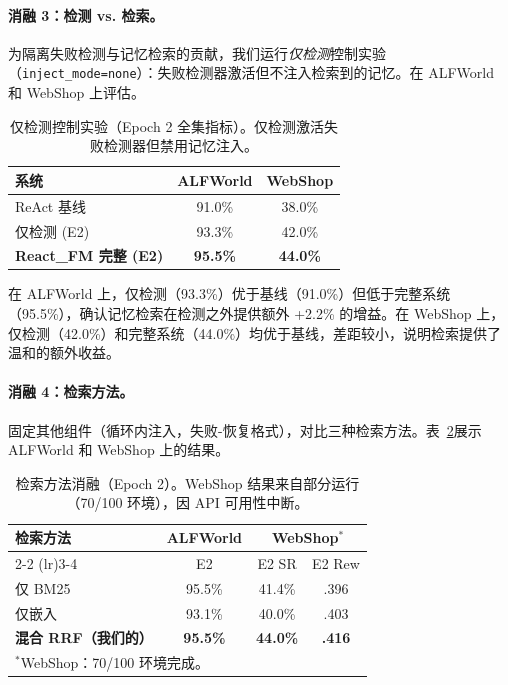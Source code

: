 \documentclass[11pt,a4paper]{article}
\newcommand{\method}{React\_FM}
\begin{document}
\paragraph{消融 3：检测 vs. 检索。}
为隔离失败检测与记忆检索的贡献，我们运行\emph{仅检测}控制实验（\texttt{inject\_mode=none}）：失败检测器激活但不注入检索到的记忆。在 ALFWorld 和 WebShop 上评估。

\begin{table}[h]
\centering
\caption{仅检测控制实验（Epoch 2 全集指标）。仅检测激活失败检测器但禁用记忆注入。}
\label{tab:detection_only}
\small
\begin{tabular}{lcc}
\toprule
系统 & ALFWorld & WebShop \\
\midrule
ReAct 基线 & 91.0\% & 38.0\% \\
仅检测 (E2) & 93.3\% & 42.0\% \\
\textbf{\method{} 完整 (E2)} & \textbf{95.5\%} & \textbf{44.0\%} \\
\bottomrule
\end{tabular}
\end{table}

在 ALFWorld 上，仅检测（93.3\%）优于基线（91.0\%）但低于完整系统（95.5\%），确认记忆检索在检测之外提供额外 +2.2\% 的增益。在 WebShop 上，仅检测（42.0\%）和完整系统（44.0\%）均优于基线，差距较小，说明检索提供了温和的额外收益。

\paragraph{消融 4：检索方法。}
固定其他组件（循环内注入，失败-恢复格式），对比三种检索方法。表~\ref{tab:retrieval_ablation}展示 ALFWorld 和 WebShop 上的结果。

\begin{table}[h]
\centering
\caption{检索方法消融（Epoch 2）。WebShop 结果来自部分运行（70/100 环境），因 API 可用性中断。}
\label{tab:retrieval_ablation}
\small
\begin{tabular}{lccc}
\toprule
\multirow{2}{*}{检索方法} & ALFWorld & \multicolumn{2}{c}{WebShop$^*$} \\
\cmidrule(lr){2-2} \cmidrule(lr){3-4}
 & E2 & E2 SR & E2 Rew \\
\midrule
仅 BM25 & 95.5\% & 41.4\% & .396 \\
仅嵌入 & 93.1\% & 40.0\% & .403 \\
\textbf{混合 RRF（我们的）} & \textbf{95.5\%} & \textbf{44.0\%} & \textbf{.416} \\
\bottomrule
\multicolumn{4}{l}{\footnotesize $^*$WebShop：70/100 环境完成。}
\end{tabular}
\end{table}
\end{document}
